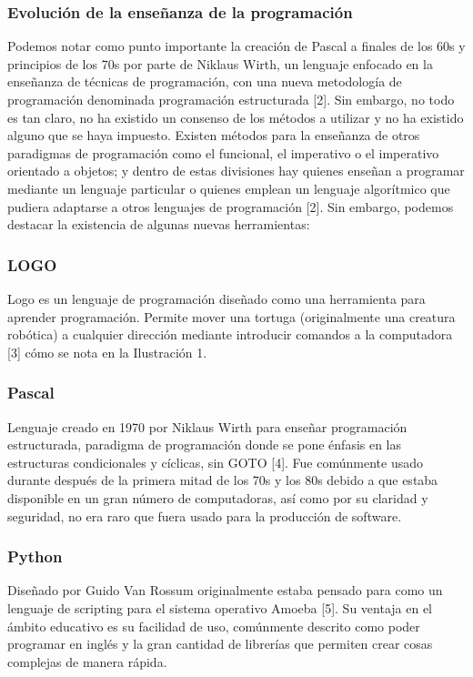 \subsubsection{Evolución de la enseñanza de la programación}
Podemos notar como punto importante la creación de Pascal a finales de los 60s y principios de los 70s por parte de Niklaus Wirth, un lenguaje enfocado en la enseñanza de técnicas de programación, con una nueva metodología de programación denominada programación estructurada [2]. Sin embargo, no todo es tan claro, no ha existido un consenso de los métodos a utilizar y no ha existido alguno que se haya impuesto. 
Existen métodos para la enseñanza de otros paradigmas de programación como el funcional, el imperativo o el imperativo orientado a objetos; y dentro de estas divisiones hay quienes enseñan a programar mediante un lenguaje particular o quienes emplean un lenguaje algorítmico que pudiera adaptarse a otros lenguajes de programación [2].
Sin embargo, podemos destacar la existencia de algunas nuevas herramientas:

\subsubsection{LOGO}
Logo es un lenguaje de programación diseñado como una herramienta para aprender programación. 
Permite mover una tortuga (originalmente una creatura robótica) a cualquier dirección 
mediante introducir comandos a la computadora [3] cómo se nota en la Ilustración 1.

\subsubsection{Pascal}
Lenguaje creado en 1970 por Niklaus Wirth para enseñar programación estructurada, 
paradigma de programación donde se pone énfasis en las 
estructuras condicionales y cíclicas, sin GOTO [4]. 
Fue comúnmente usado durante después de la primera mitad de los 70s y los 80s 
debido a que estaba disponible en un gran número de computadoras, 
así como por su claridad y seguridad, no era raro que fuera usado para la 
producción de software.

\subsubsection{Python}
Diseñado por Guido Van Rossum originalmente estaba pensado 
para como un lenguaje de scripting para el sistema operativo Amoeba [5]. 
Su ventaja en el ámbito educativo es su facilidad de uso, comúnmente descrito 
como poder programar en inglés y la gran cantidad de librerías que permiten 
crear cosas complejas de manera rápida.

